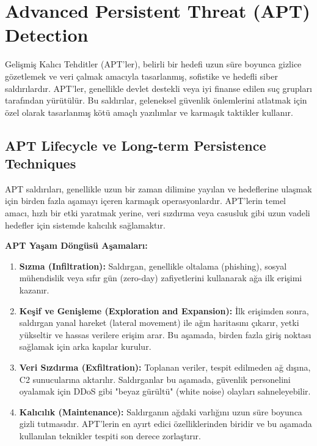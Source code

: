 \section{Advanced Persistent Threat (APT) Detection}

Gelişmiş Kalıcı Tehditler (APT'ler), belirli bir hedefi uzun süre boyunca gizlice gözetlemek ve veri çalmak amacıyla tasarlanmış, sofistike ve hedefli siber saldırılardır. APT'ler, genellikle devlet destekli veya iyi finanse edilen suç grupları tarafından yürütülür. Bu saldırılar, geleneksel güvenlik önlemlerini atlatmak için özel olarak tasarlanmış kötü amaçlı yazılımlar ve karmaşık taktikler kullanır.

\subsection{APT Lifecycle ve Long-term Persistence Techniques}

APT saldırıları, genellikle uzun bir zaman dilimine yayılan ve hedeflerine ulaşmak için birden fazla aşamayı içeren karmaşık operasyonlardır. APT'lerin temel amacı, hızlı bir etki yaratmak yerine, veri sızdırma veya casusluk gibi uzun vadeli hedefler için sistemde kalıcılık sağlamaktır.

\textbf{APT Yaşam Döngüsü Aşamaları:}

\begin{enumerate}
    \item \textbf{Sızma (Infiltration):} Saldırgan, genellikle oltalama (phishing), sosyal mühendislik veya sıfır gün (zero-day) zafiyetlerini kullanarak ağa ilk erişimi kazanır.
    \item \textbf{Keşif ve Genişleme (Exploration and Expansion):} İlk erişimden sonra, saldırgan yanal hareket (lateral movement) ile ağın haritasını çıkarır, yetki yükseltir ve hassas verilere erişim arar. Bu aşamada, birden fazla giriş noktası sağlamak için arka kapılar kurulur.
    \item \textbf{Veri Sızdırma (Exfiltration):} Toplanan veriler, tespit edilmeden ağ dışına, C2 sunucularına aktarılır. Saldırganlar bu aşamada, güvenlik personelini oyalamak için DDoS gibi "beyaz gürültü" (white noise) olayları sahneleyebilir.
    \item \textbf{Kalıcılık (Maintenance):} Saldırganın ağdaki varlığını uzun süre boyunca gizli tutmasıdır. APT'lerin en ayırt edici özelliklerinden biridir ve bu aşamada kullanılan teknikler tespiti son derece zorlaştırır.
\end{enumerate}

